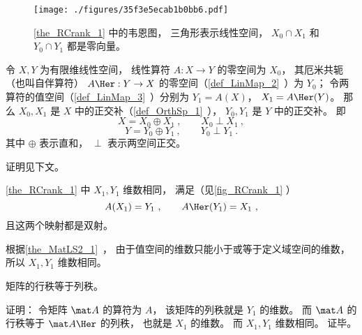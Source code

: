 

\begin{figure}[ht]
\centering
\texttt{[image: ./figures/35f3e5ecab1b0bb6.pdf]}
\caption{\autoref{the_RCrank_1} 中的韦恩图， 三角形表示线性空间， $X_0\cap X_1$ 和 $Y_0\cap  Y_1$ 都是零向量。} \label{fig_RCrank_1}
\end{figure}

\begin{theorem}{}\label{the_RCrank_1}
令 $X, Y$ 为有限维线性空间， 线性算符 $A:X \to Y$ 的零空间为 $X_0$， 其厄米共轭（也叫自伴算符） $A\Her: Y \to X$ 的零空间（\autoref{def_LinMap_2}~）为 $Y_0$； 令两算符的值空间（\autoref{def_LinMap_3}~）分别为 $Y_1 = A(X)$， $X_1 = A\Her(Y)$。 那么 $X_0, X_1$ 是 $X$ 中的正交补（\autoref{def_OrthSp_1}~）， $Y_0, Y_1$ 是 $Y$ 中的正交补。 即
\begin{equation}
X = X_0 \oplus X_1~, \qquad X_0 \perp X_1~,
\end{equation}
\begin{equation}
Y = Y_0 \oplus Y_1~, \qquad Y_0 \perp Y_1~.
\end{equation}
其中 $\oplus$ 表示直和， $\perp$ 表示两空间正交。
\end{theorem}
证明见下文。

\begin{corollary}{}
\autoref{the_RCrank_1} 中 $X_1, Y_1$ 维数相同， 满足（见\autoref{fig_RCrank_1} ）
\begin{equation}\label{eq_RCrank_3}
A(X_1) = Y_1~, \qquad A\Her (Y_1) = X_1~,
\end{equation}
且这两个映射都是双射。
\end{corollary}
根据\autoref{the_MatLS2_1}~， 
由于值空间的维数只能小于或等于定义域空间的维数， 所以 $X_1, Y_1$ 维数相同。

\begin{corollary}{}\label{cor_RCrank_1}
矩阵的行秩等于列秩。
\end{corollary}
证明： 令矩阵 $\mat A$ 的算符为 $A$， 该矩阵的列秩就是 $Y_1$ 的维数。 而 $\mat A$ 的行秩等于 $\mat A\Her$ 的列秩， 也就是 $X_1$ 的维数。 而 $X_1, Y_1$ 维数相同。 证毕。

